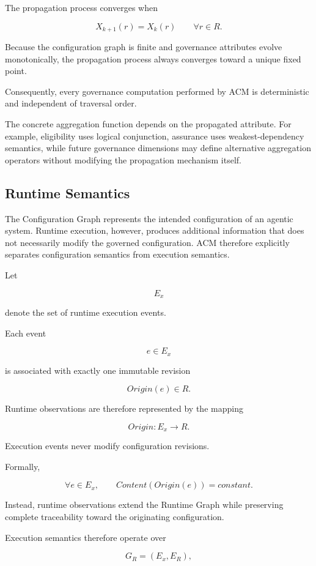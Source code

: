 \documentclass[10pt]{article}
\begin{document}
The propagation process converges when

\[
X_{k+1}(r)
=
X_k(r)
\qquad
\forall r\in R.
\]

Because the configuration graph is finite and governance attributes evolve monotonically, the propagation process always converges toward a unique fixed point.

Consequently, every governance computation performed by ACM is deterministic and independent of traversal order.

The concrete aggregation function depends on the propagated attribute. For example, eligibility uses logical conjunction, assurance uses weakest-dependency semantics, while future governance dimensions may define alternative aggregation operators without modifying the propagation mechanism itself.

\subsection{Runtime Semantics}
\label{sec:runtime_semantics}

The Configuration Graph represents the intended configuration of an agentic system. Runtime execution, however, produces additional information that does not necessarily modify the governed configuration. ACM therefore explicitly separates configuration semantics from execution semantics.

Let

\[
E_x
\]

denote the set of runtime execution events.

Each event

\[
e
\in
E_x
\]

is associated with exactly one immutable revision

\[
Origin(e)
\in
R.
\]

Runtime observations are therefore represented by the mapping

\[
Origin:E_x\rightarrow R.
\]

Execution events never modify configuration revisions.

Formally,

\[
\forall
e
\in
E_x,
\qquad
Content(Origin(e))
=
constant.
\]

Instead, runtime observations extend the Runtime Graph while preserving complete traceability toward the originating configuration.

Execution semantics therefore operate over

\[
G_R=(E_x,E_R),
\]
\end{document}
